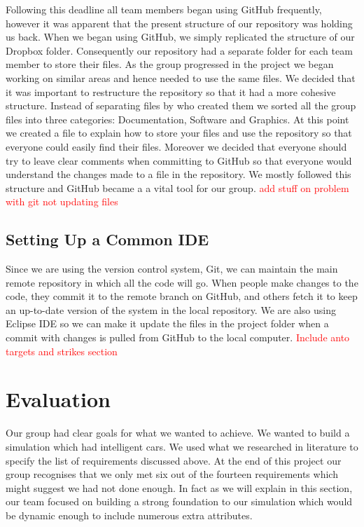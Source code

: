\documentclass{article}
\begin{document}
    Following this deadline all team members began using GitHub frequently, however it was apparent that the present structure of our repository was holding us back. When we began using GitHub, we simply replicated the structure of our Dropbox folder. Consequently our repository had a separate folder for each team member to store their files. As the group progressed in the project we began working on similar areas and hence needed to use the same files. We decided that it was important to restructure the repository so that it had a more cohesive structure. Instead of separating files by who created them we sorted all the group files into three categories: Documentation, Software and Graphics. At this point we created a file to explain how to store your files and use the repository so that everyone could easily find their files. Moreover we decided that everyone should try to leave clear comments when committing to GitHub so that everyone would understand the changes made to a file in the repository. We mostly followed this structure and GitHub became a a vital tool for our group. 
    \textcolor{red}{add stuff on problem with git not updating files}
   
   	\subsection{Setting Up a Common IDE}
   	
   	Since we are using the version control system, Git, we can maintain the main remote repository in which all the code will go. 
   	When people make changes to the code, they commit it to the remote branch on GitHub, and others fetch it to keep an up-to-date version of the system in the local repository. 
   	We are also using Eclipse IDE so we can make it update the files in the project folder when a commit with changes is pulled from GitHub to the local computer.
   	\textcolor{red}{Include anto targets and strikes section}
    
	\section{Evaluation}
	Our group had clear goals for what we wanted to achieve. We wanted to build a simulation which had intelligent cars. We used what we researched in literature to specify the list of requirements discussed above. At the end of this project our group recognises that we only met six out of the fourteen requirements which might suggest we had not done enough. In fact as we will explain in this section, our team focused on building a strong foundation to our simulation which would be dynamic enough to include numerous extra attributes. 
	
\end{document}
